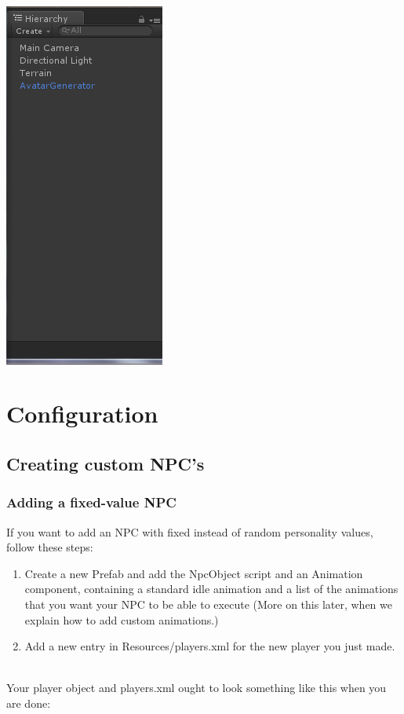 \documentclass[11pt]{article} %
\begin{document}
~\\
\includegraphics{2}
~\\ 

\newpage
\section{Configuration}
\subsection{Creating custom NPC's}
\subsubsection{Adding a fixed-value NPC}
If you want to add an NPC with fixed instead of random personality values, follow these steps:

\begin{enumerate}
\item Create a new Prefab and add the NpcObject script and an Animation component, containing a standard idle animation and a list of the animations that you want your NPC to be able to execute (More on this later, when we explain how to add custom animations.)
\item Add a new entry in Resources/players.xml for the new player you just made. 
\end{enumerate}
~\\
Your player object and players.xml ought to look something like this when you are done:
\end{document}
